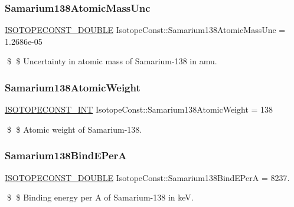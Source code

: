 \subsubsection{\texorpdfstring{Samarium138\+Atomic\+Mass\+Unc}{Samarium138AtomicMassUnc}}
{\footnotesize\ttfamily \mbox{\hyperlink{group___isotope_const-_macros_ga8f45a7272ce02c0b4c65c44636ed719a}{I\+S\+O\+T\+O\+P\+E\+C\+O\+N\+S\+T\+\_\+\+D\+O\+U\+B\+LE}} Isotope\+Const\+::\+Samarium138\+Atomic\+Mass\+Unc = 1.\+2686e-\/05}

\$ \$ Uncertainty in atomic mass of Samarium-\/138 in amu. \mbox{\label{group___isotope_const-_samarium-_sm138_ga8a84380e035b0abe734fba76b2826278}} 
\subsubsection{\texorpdfstring{Samarium138\+Atomic\+Weight}{Samarium138AtomicWeight}}
{\footnotesize\ttfamily \mbox{\hyperlink{group___isotope_const-_macros_ga5f18360b3e99483a35c32d789e62621c}{I\+S\+O\+T\+O\+P\+E\+C\+O\+N\+S\+T\+\_\+\+I\+NT}} Isotope\+Const\+::\+Samarium138\+Atomic\+Weight = 138}

\$ \$ Atomic weight of Samarium-\/138. \mbox{\label{group___isotope_const-_samarium-_sm138_ga286ded554aa89c7aa09af31d4cb61207}} 
\subsubsection{\texorpdfstring{Samarium138\+Bind\+E\+PerA}{Samarium138BindEPerA}}
{\footnotesize\ttfamily \mbox{\hyperlink{group___isotope_const-_macros_ga8f45a7272ce02c0b4c65c44636ed719a}{I\+S\+O\+T\+O\+P\+E\+C\+O\+N\+S\+T\+\_\+\+D\+O\+U\+B\+LE}} Isotope\+Const\+::\+Samarium138\+Bind\+E\+PerA = 8237.}

\$ \$ Binding energy per A of Samarium-\/138 in keV. \mbox{\label{group___isotope_const-_samarium-_sm138_ga8b39428e30a391408bf910221767ca85}} 
